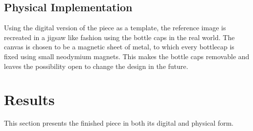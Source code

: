 \documentclass{article}
\begin{document}
\subsection{Physical Implementation}
Using the digital version of the piece as a template, the reference image is recreated in a jigsaw like fashion using the bottle caps in the real world. The canvas is chosen to be a magnetic sheet of metal, to which every bottlecap is fixed using small neodymium magnets. This makes the bottle caps removable and leaves the possibility open to change the design in the future.
\section{Results} \label{results}
This section presents the finished piece in both its digital and physical form.
\end{document}
